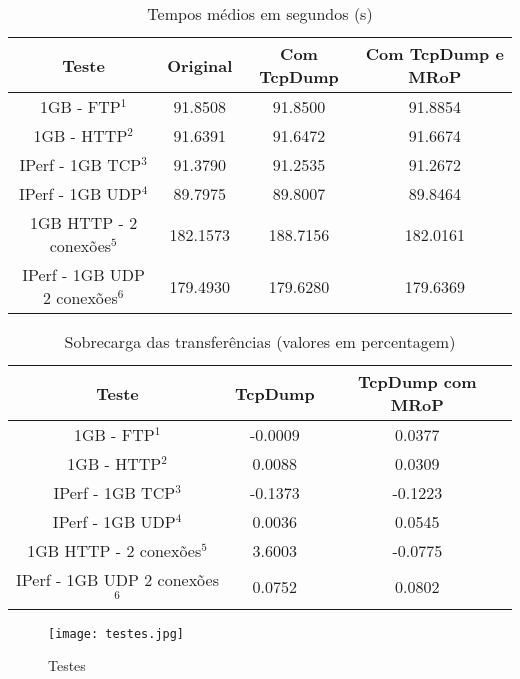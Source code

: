 \begin{table}[!htb]
\begin{center}
\caption{Tempos médios em segundos (s)}
\begin{tabular}{ | c | c | c | c |  }
\hline
Teste & \hspace {0.3cm} Original \hspace {0.3cm}& \hspace {0.2cm} Com TcpDump \hspace {0.2cm} & Com TcpDump e MRoP \\
\hline
1GB - FTP$^{1}$ & 91.8508	& 91.8500 & 91.8854 \\
1GB - HTTP$^{2}$ & 91.6391 & 91.6472 & 91.6674 \\ 
IPerf - 1GB TCP$^{3}$ & 91.3790	& 91.2535	& 91.2672 \\
IPerf - 1GB UDP$^{4}$ & 89.7975 & 89.8007 & 89.8464 \\
\hline
\hline
1GB HTTP - 2 conexões$^{5}$ & 182.1573 & 188.7156 & 182.0161 \\
IPerf - 1GB UDP 2 conexões$^{6}$ & 179.4930 & 179.6280 & 179.6369 \\
\hline
\end{tabular}
\label{tab:desempenho}
\end{center}
\end{table}

\begin{table}[!htb]
\begin{center}
\caption{Sobrecarga das transferências (valores em percentagem)}
\begin{tabular}{ | c | c | c |}
\hline
Teste & \hspace {0.3cm} TcpDump \hspace {0.3cm} & TcpDump com MRoP  \\

\hline
1GB - FTP$^{1}$ & -0.0009  & 0.0377  \\
1GB - HTTP$^{2}$ & 0.0088 &  0.0309   \\
IPerf - 1GB TCP$^{3}$ & -0.1373 &  -0.1223   \\
IPerf - 1GB UDP$^{4}$ & 0.0036 & 0.0545 \\
\hline
\hline
1GB HTTP - 2 conexões$^{5}$ & 3.6003 & -0.0775   \\
IPerf - 1GB UDP 2 conexões$^{6}$ & 0.0752 & 0.0802   \\
\hline
\end{tabular}
\label{tab:overhead}
\end{center}
\end{table}

\begin{figure}[!ht]
\centering
\texttt{[image: testes.jpg]}
\caption{Testes}
\label{fig:tests_graphics}
\end{figure}

